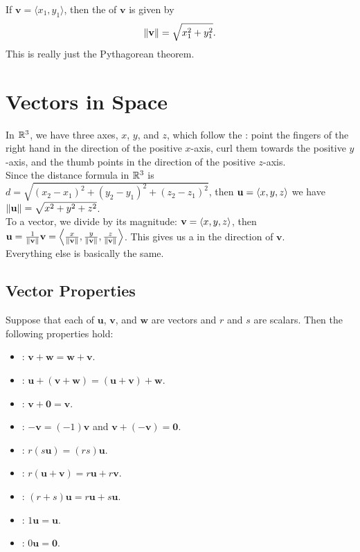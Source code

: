If \(\mathbf{v} = \langle x_{1},y_{1} \rangle\), then the  of \(\mathbf{v}\) is given by
\[
    \left\lVert \mathbf{v}\right\rVert = \sqrt{x_{1}^{2}+y_{1}^{2}}.
\]
This is really just the Pythagorean theorem. \\

\section{Vectors in Space}

In \(\mathbb{R}^{3}\), we have three axes, \(x\), \(y\), and \(z\), which follow the : point the fingers of the right hand in the direction of the positive \(x\)-axis, curl them towards the positive \(y\)-axis, and the thumb points in the direction of the positive \(z\)-axis. \\

Since the distance formula in \(\mathbb{R}^{3}\) is \(d = \sqrt{(x_{2} - x_{1})^{2} + (y_{2} - y_{1})^{2} + (z_{2} - z_{1})^{2}}\), then \(\mathbf{u} = \left\langle x,y,z \right\rangle\) we have \(\left\lVert \mathbf{u}\right\rVert = \sqrt{x^{2} + y^{2} + z^{2}}\). \\

To  a vector, we divide by its magnitude: \(\mathbf{v} = \left\langle x,y,z \right\rangle\), then \(\mathbf{u} = \frac{1}{\left\lVert \mathbf{v}\right\rVert}\mathbf{v} = \left\langle \frac{x}{\left\lVert \mathbf{v}\right\rVert},\frac{y}{\left\lVert \mathbf{v}\right\rVert},\frac{z}{\left\lVert \mathbf{v}\right\rVert} \right\rangle\). This gives us a  in the direction of \(\mathbf{v}\). \\

Everything else is basically the same.

\subsection{Vector Properties}

Suppose that each of \(\mathbf{u}\), \(\mathbf{v}\), and \(\mathbf{w}\) are vectors and \(r\) and \(s\) are scalars. Then the following properties hold:
\begin{itemize}
    \item {}: \(\mathbf{v} + \mathbf{w} = \mathbf{w} + \mathbf{v}\).
    \item {}: \(\mathbf{u} + (\mathbf{v} + \mathbf{w}) = (\mathbf{u} + \mathbf{v}) + \mathbf{w}\).
    \item {}: \(\mathbf{v} + \mathbf{0} = \mathbf{v}\).
    \item {}: \(-\mathbf{v} = (-1)\mathbf{v}\) and \(\mathbf{v} + (-\mathbf{v}) = \mathbf{0}\).
    \item {}: \(r(s\mathbf{u})= (rs)\mathbf{u}\).
    \item {}: \(r(\mathbf{u} + \mathbf{v}) = r\mathbf{u} + r\mathbf{v}\).
    \item {}: \((r+s)\mathbf{u} = r\mathbf{u} + s\mathbf{u}\).
    \item {}: \(1\mathbf{u} = \mathbf{u}\).
    \item {}: \(0\mathbf{u} = \mathbf{0}\).
\end{itemize}

